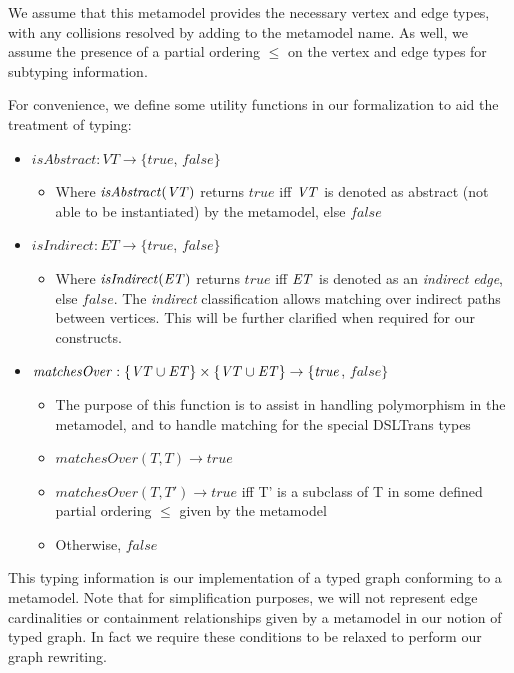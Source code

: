 We assume that this metamodel provides the necessary vertex and edge types, with any collisions resolved by adding to the metamodel name. As well, we assume the presence of a partial ordering $\leq$ on the vertex and edge types for subtyping information.

For convenience, we define some utility functions in our formalization to aid the treatment of typing:

\begin{itemize}
\item $\mathit{isAbstract}: \mathit{VT} \rightarrow \{\mathit{true}$, $\mathit{false}\}$
\begin{itemize}
\item Where $\mathit{isAbstract}(\mathit{VT})$ returns $\mathit{true}$ iff $\mathit{VT}$ is denoted as abstract (not able to be instantiated) by the metamodel, else $\mathit{false}$
\end{itemize}

\item $\mathit{isIndirect}: \mathit{ET} \rightarrow \{\mathit{true}$, $\mathit{false}\}$
\begin{itemize}
\item Where $\mathit{isIndirect}(\mathit{ET})$ returns $\mathit{true}$ iff $\mathit{ET}$ is denoted as an \textit{indirect edge}, else $\mathit{false}$. The \textit{indirect} classification allows matching over indirect paths between vertices. This will be further clarified when required for our constructs.
\end{itemize}

\item $\mathit{matchesOver}: \{\mathit{VT} \cup \mathit{ET}\} \times \{\mathit{VT} \cup \mathit{ET}\} \rightarrow \{\mathit{true}$, $\mathit{false}\}$

\begin{itemize}
\item The purpose of this function is to assist in handling polymorphism in the metamodel, and to handle matching for the special DSLTrans types
\item $\mathit{matchesOver}(T, T) \rightarrow \mathit{true}$
\item $\mathit{matchesOver}(T, T') \rightarrow \mathit{true}$ iff T' is a subclass of T in some defined partial ordering $\leq$ given by the metamodel
\item Otherwise, $\mathit{false}$
\end{itemize}
\end{itemize}

This typing information is our implementation of a typed graph conforming to a metamodel. Note that for simplification purposes, we will not represent edge cardinalities or containment relationships given by a metamodel in our notion of typed graph. In fact we require these conditions to be relaxed to perform our graph rewriting.


